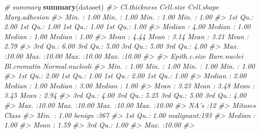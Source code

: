 \documentclass[]{book}
\newenvironment{Shaded}{\begin{snugshade}}{\end{snugshade}}
\newcommand{\CommentTok}[1]{\textcolor[rgb]{0.56,0.35,0.01}{\textit{#1}}}
\newcommand{\KeywordTok}[1]{\textcolor[rgb]{0.13,0.29,0.53}{\textbf{#1}}}
\newcommand{\NormalTok}[1]{#1}
\begin{document}
\begin{Shaded}
\begin{Highlighting}[]
\CommentTok{# summary}
\KeywordTok{summary}\NormalTok{(dataset)}
\CommentTok{#>   Cl.thickness     Cell.size       Cell.shape    Marg.adhesion  }
\CommentTok{#>  Min.   : 1.00   Min.   : 1.00   Min.   : 1.00   Min.   : 1.00  }
\CommentTok{#>  1st Qu.: 2.00   1st Qu.: 1.00   1st Qu.: 1.00   1st Qu.: 1.00  }
\CommentTok{#>  Median : 4.00   Median : 1.00   Median : 1.00   Median : 1.00  }
\CommentTok{#>  Mean   : 4.44   Mean   : 3.14   Mean   : 3.21   Mean   : 2.79  }
\CommentTok{#>  3rd Qu.: 6.00   3rd Qu.: 5.00   3rd Qu.: 5.00   3rd Qu.: 4.00  }
\CommentTok{#>  Max.   :10.00   Max.   :10.00   Max.   :10.00   Max.   :10.00  }
\CommentTok{#>                                                                 }
\CommentTok{#>   Epith.c.size    Bare.nuclei     Bl.cromatin    Normal.nucleoli}
\CommentTok{#>  Min.   : 1.00   Min.   : 1.00   Min.   : 1.00   Min.   : 1.00  }
\CommentTok{#>  1st Qu.: 2.00   1st Qu.: 1.00   1st Qu.: 2.00   1st Qu.: 1.00  }
\CommentTok{#>  Median : 2.00   Median : 1.00   Median : 3.00   Median : 1.00  }
\CommentTok{#>  Mean   : 3.23   Mean   : 3.48   Mean   : 3.45   Mean   : 2.94  }
\CommentTok{#>  3rd Qu.: 4.00   3rd Qu.: 5.25   3rd Qu.: 5.00   3rd Qu.: 4.00  }
\CommentTok{#>  Max.   :10.00   Max.   :10.00   Max.   :10.00   Max.   :10.00  }
\CommentTok{#>                  NA's   :12                                     }
\CommentTok{#>     Mitoses            Class    }
\CommentTok{#>  Min.   : 1.00   benign   :367  }
\CommentTok{#>  1st Qu.: 1.00   malignant:193  }
\CommentTok{#>  Median : 1.00                  }
\CommentTok{#>  Mean   : 1.59                  }
\CommentTok{#>  3rd Qu.: 1.00                  }
\CommentTok{#>  Max.   :10.00                  }
\CommentTok{#> }
\end{Highlighting}
\end{Shaded}
\end{document}
